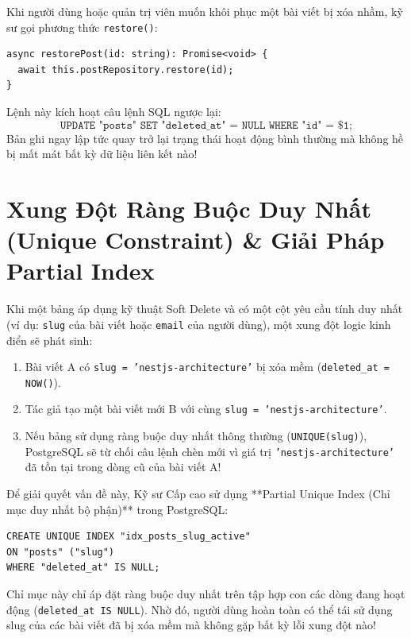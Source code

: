 \documentclass[12pt,a4paper,oneside]{book}
\begin{document}
Khi người dùng hoặc quản trị viên muốn khôi phục một bài viết bị xóa nhầm, kỹ sư gọi phương thức \texttt{restore()}:
\begin{codebox}
\begin{Verbatim}[fontsize=\small]
async restorePost(id: string): Promise<void> {
  await this.postRepository.restore(id);
}
\end{Verbatim}
\end{codebox}
Lệnh này kích hoạt câu lệnh SQL ngược lại:
\begin{equation}
  \texttt{UPDATE "posts" SET "deleted\_at" = NULL WHERE "id" = \$1;}
\end{equation}
Bản ghi ngay lập tức quay trở lại trạng thái hoạt động bình thường mà không hề bị mất mát bất kỳ dữ liệu liên kết nào!

\section{Xung Đột Ràng Buộc Duy Nhất (Unique Constraint) \& Giải Pháp Partial Index}
Khi một bảng áp dụng kỹ thuật Soft Delete và có một cột yêu cầu tính duy nhất (ví dụ: \texttt{slug} của bài viết hoặc \texttt{email} của người dùng), một xung đột logic kinh điển sẽ phát sinh:
\begin{enumerate}
  \item Bài viết A có \texttt{slug = 'nestjs-architecture'} bị xóa mềm (\texttt{deleted\_at = NOW()}).
  \item Tác giả tạo một bài viết mới B với cùng \texttt{slug = 'nestjs-architecture'}.
  \item Nếu bảng sử dụng ràng buộc duy nhất thông thường (\texttt{UNIQUE(slug)}), PostgreSQL sẽ từ chối câu lệnh chèn mới vì giá trị \texttt{'nestjs-architecture'} đã tồn tại trong dòng cũ của bài viết A!
\end{enumerate}

Để giải quyết vấn đề này, Kỹ sư Cấp cao sử dụng **Partial Unique Index (Chỉ mục duy nhất bộ phận)** trong PostgreSQL:
\begin{codebox}
\begin{Verbatim}[fontsize=\small]
CREATE UNIQUE INDEX "idx_posts_slug_active" 
ON "posts" ("slug") 
WHERE "deleted_at" IS NULL;
\end{Verbatim}
\end{codebox}
Chỉ mục này chỉ áp đặt ràng buộc duy nhất trên tập hợp con các dòng đang hoạt động (\texttt{deleted\_at IS NULL}). Nhờ đó, người dùng hoàn toàn có thể tái sử dụng slug của các bài viết đã bị xóa mềm mà không gặp bất kỳ lỗi xung đột nào!
\end{document}
